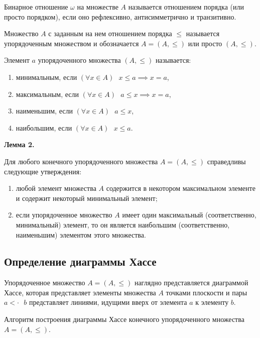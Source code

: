 \documentclass[bachelor, och, labwork]{shiza}
\begin{document}
        Бинарное отношение $\omega$ на множестве $A$ называется отношением порядка (или просто порядком), если оно
        рефлексивно, антисимметрично и транзитивно.

        Множество $A$ с заданным на нем отношением порядка $\leq$ называется упорядоченным множеством и обозначается $A
        = (A, \leq)$ или просто $(A, \leq)$.

        Элемент $a$ упорядоченного множества $(A, \leq)$ называется:
        \begin{enumerate}
            \item минимальным, если $(\forall x \in A) \text{ } x \leq a \implies x = a$,
            \item максимальным, если $(\forall x \in A) \text{ } a \leq x \implies x = a$,
            \item наименьшим, если $(\forall x \in A) \text{ } a \leq x$,
            \item наибольшим, если $(\forall x \in A) \text{ } x \leq a$.
        \end{enumerate}

        \textbf{Лемма 2.}

        Для любого конечного упорядоченного множества $A = (A, \leq)$ справедливы следующие утверждения:
        \begin{enumerate}
            \item любой элемент множества $A$ содержится в некотором максимальном элементе и содержит некоторый
            минимальный элемент;
            \item если упорядоченное множество $A$ имеет один максимальный (соответственно, минимальный) элемент, то он
            является наибольшим (соответственно, наименьшим) элементом этого множества.
        \end{enumerate}

    \subsection{Определение диаграммы Хассе}

        Упорядоченное множество $A = (A, \leq)$ наглядно представляется диаграммой Хассе, которая представляет элементы множества $A$ точками плоскости и пары $a <\cdot \text{ } b$ представляет линиями, идущими вверх от элемента $a$ к элементу $b$.

        Алгоритм построения диаграммы Хассе конечного упорядоченного множества $A = (A, \leq)$.
\end{document}
